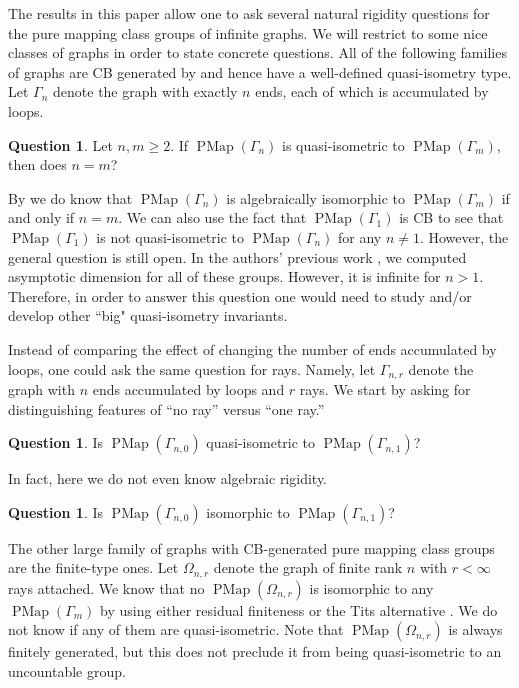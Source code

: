 \documentclass[11pt]{amsart}
\theoremstyle{plain}
\theoremstyle{definition}
\newtheorem{Q}[THM]{Question}
\DeclareMathOperator{\PMap}{PMap}
\def\G{{\Gamma}}
\newcommand{\<}{\langle}
\renewcommand{\>}{\rangle}
\begin{document}
The results in this paper allow one to ask several natural rigidity questions for the pure mapping class groups of infinite graphs. We will restrict to some nice classes of graphs in order to state concrete questions. All of the following families of graphs are CB generated by  and hence have a well-defined quasi-isometry type. Let $\G_{n}$ denote the graph with exactly $n$ ends, each of which is accumulated by loops. 

\begin{Q}
    Let $n,m \ge 2$. If $\PMap(\G_{n})$ is quasi-isometric to $\PMap(\G_{m})$, then does $n=m$? 
\end{Q}

By  we do know that $\PMap(\G_n)$ is algebraically isomorphic to $\PMap(\G_m)$ if and only if $n=m$. We can also use the fact that $\PMap(\G_1)$ is CB to see that $\PMap(\G_1)$ is not quasi-isometric to $\PMap(\G_n)$ for any $n \neq 1$. However, the general question is still open. In the authors' previous work \cite{DHK2023}, we computed asymptotic dimension for all of these groups. However, it is infinite for $n>1$. Therefore, in order to answer this question one would need to study and/or develop other ``big" quasi-isometry invariants. 

Instead of comparing the effect of changing the number of ends accumulated by loops, one could ask the same question for rays. Namely, let $\G_{n,r}$ denote the graph with $n$ ends accumulated by loops and $r$ rays. We start by asking for distinguishing features of ``no ray'' versus ``one ray.''

\begin{Q}
    Is $\PMap(\G_{n,0})$ quasi-isometric to $\PMap(\G_{n,1})$? 
\end{Q}

In fact, here we do not even know algebraic rigidity. 

\begin{Q}
    Is $\PMap(\G_{n,0})$ isomorphic to $\PMap(\G_{n,1})$?
\end{Q}

The other large family of graphs with CB-generated pure mapping class groups are the finite-type ones. Let $\Omega_{n,r}$ denote the graph of finite rank $n$ with $r<\infty$ rays attached. We know that no $\PMap(\Omega_{n,r})$ is isomorphic to any $\PMap(\G_{m})$ by using either residual finiteness  or the Tits alternative . We do not know if any of them are quasi-isometric. Note that $\PMap(\Omega_{n,r})$ is always finitely generated, but this does not preclude it from being quasi-isometric to an uncountable group.
\end{document}
